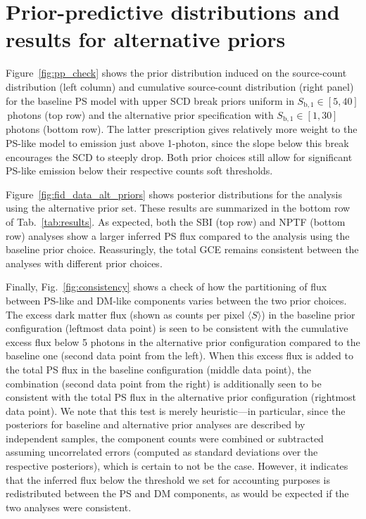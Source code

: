 \documentclass[prd,aps,10pt,nofootinbib,twocolumn,superscriptaddress,preprintnumbers,balancelastpage,longbibliography]{revtex4-1}
\begin{document}



\vspace{.2cm}

\appendix

\section{Prior-predictive distributions and results for alternative priors}
\label{app:priors}

Figure~\ref{fig:pp_check} shows the prior distribution induced on the source-count distribution (left column) and cumulative source-count distribution (right panel) for the baseline PS model with upper SCD break priors uniform in $S_{\mathrm{b}, 1}  \in  [5, 40]$\,photons (top row) and the alternative prior specification with $S_{\mathrm{b}, 1}  \in  [1, 30]$\,photons (bottom row). The latter prescription gives relatively more weight to the PS-like model to emission just above 1-photon, since the slope below this break encourages the SCD to steeply drop. Both prior choices still allow for significant PS-like emission below their respective counts soft thresholds.

Figure~\ref{fig:fid_data_alt_priors} shows posterior distributions for the analysis using the alternative prior set. These results are summarized in the bottom row of Tab.~\ref{tab:results}. As expected, both the SBI (top row) and NPTF (bottom row) analyses show a larger inferred PS flux compared to the analysis using the baseline prior choice. Reassuringly, the total GCE remains consistent between the analyses with different prior choices.

Finally, Fig.~\ref{fig:consistency} shows a check of how the partitioning of flux between PS-like and DM-like components varies between the two prior choices. 
The excess dark matter flux (shown as counts per pixel $\langle S \rangle$) in the baseline prior configuration (leftmost data point) is seen to be consistent with the cumulative excess flux below 5 photons in the alternative prior configuration compared to the baseline one (second data point from the left). When this excess flux is added to the total PS flux in the baseline configuration (middle data point), the combination (second data point from the right) is additionally seen to be consistent with the total PS flux in the alternative prior configuration (rightmost data point). We note that this test is merely heuristic---in particular, since the posteriors for baseline and alternative prior analyses are described by independent samples, the component counts were combined or subtracted assuming uncorrelated errors (computed as standard deviations over the respective posteriors), which is certain to not be the case. However, it indicates that the inferred flux below the threshold we set for accounting purposes is redistributed between the PS and DM components, as would be expected if the two analyses were consistent.
\end{document}

